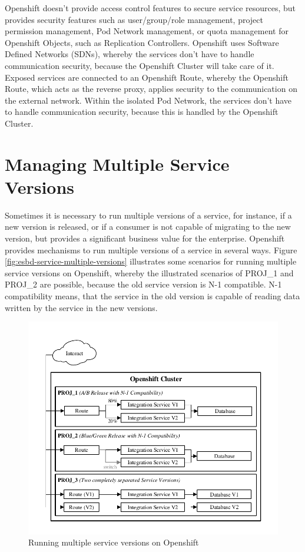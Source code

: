 Openshift doesn't provide access control features to secure service resources, but provides security features such as user/group/role management, project permission management, Pod Network management, or quota management for Openshift Objects, such as Replication Controllers. Openshift uses Software Defined Networks (SDNs), whereby 
the services don't have to handle communication security, because the Openshift Cluster will take care of it. Exposed services are connected to an Openshift Route, whereby the Openshift Route, which acts as the reverse proxy, applies security to the communication on the external network. Within the isolated Pod Network, the services don't have to handle communication security, because this is handled by the Openshift Cluster. 

\section{Managing Multiple Service Versions}
\label{sec:esbd-multi-version-service}
Sometimes it is necessary to run multiple versions of a service, for instance, if a new version is released, or if a consumer is not capable of migrating to the new version, but provides a significant business value for the enterprise. Openshift provides mechanisms to run multiple versions of a service in several ways. Figure \vref{fig:esbd-service-multiple-versions} illustrates some scenarios for running multiple service versions on Openshift, whereby the illustrated scenarios of PROJ\_1 and PROJ\_2 are possible, because the old service version is N-1 compatible. N-1 compatibility means, that the service in the old version is capable of reading data written by the service in the new versions.
\newpage

\begin{figure}[htbp]
	\centering
	\includegraphics[scale=1]{images/esbd-service-multiple-versions.pdf}
	\caption{Running multiple service versions on Openshift}
	\label{fig:esbd-service-multiple-versions}
\end{figure}


